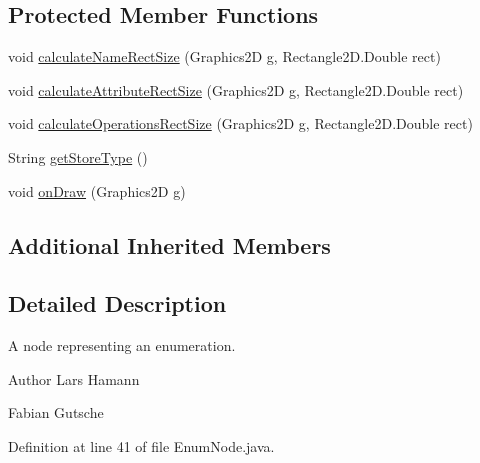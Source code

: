 \subsection*{Protected Member Functions}
\begin{DoxyCompactItemize}
\item 
void \hyperlink{classorg_1_1tzi_1_1use_1_1gui_1_1views_1_1diagrams_1_1classdiagram_1_1_enum_node_a308de9c37332de938d3c8b3b7bf53f07}{calculate\-Name\-Rect\-Size} (Graphics2\-D g, Rectangle2\-D.\-Double rect)
\item 
void \hyperlink{classorg_1_1tzi_1_1use_1_1gui_1_1views_1_1diagrams_1_1classdiagram_1_1_enum_node_a1d5a80824d6eebc59ee4c0157d445d5b}{calculate\-Attribute\-Rect\-Size} (Graphics2\-D g, Rectangle2\-D.\-Double rect)
\item 
void \hyperlink{classorg_1_1tzi_1_1use_1_1gui_1_1views_1_1diagrams_1_1classdiagram_1_1_enum_node_ac5b57bba558ed261b112ded35237aefc}{calculate\-Operations\-Rect\-Size} (Graphics2\-D g, Rectangle2\-D.\-Double rect)
\item 
String \hyperlink{classorg_1_1tzi_1_1use_1_1gui_1_1views_1_1diagrams_1_1classdiagram_1_1_enum_node_a030482f400d255a84bfcbe93bed02795}{get\-Store\-Type} ()
\item 
void \hyperlink{classorg_1_1tzi_1_1use_1_1gui_1_1views_1_1diagrams_1_1classdiagram_1_1_enum_node_a4f69760a6add89adc85bb8c0dcbb3006}{on\-Draw} (Graphics2\-D g)
\end{DoxyCompactItemize}
\subsection*{Additional Inherited Members}


\subsection{Detailed Description}
A node representing an enumeration.

\begin{DoxyAuthor}{Author}
Lars Hamann 

Fabian Gutsche 
\end{DoxyAuthor}


Definition at line 41 of file Enum\-Node.\-java.



